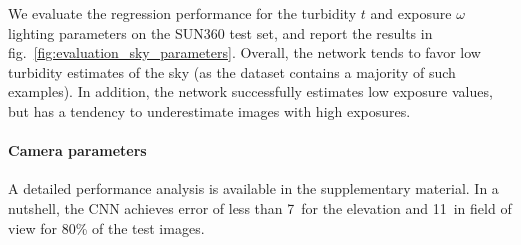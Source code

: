 
We evaluate the regression performance for the turbidity $t$ and exposure $\omega$ lighting parameters on the SUN360 test set, and report the results in fig.~\ref{fig:evaluation_sky_parameters}. Overall, the network tends to favor low turbidity estimates of the sky (as the dataset contains a majority of such examples). In addition, the network successfully estimates low exposure values, but has a tendency to underestimate images with high exposures.%
\vspace{-1.5em}
\paragraph{Camera parameters}

A detailed performance analysis is available in the supplementary material. In a nutshell, the CNN achieves error of less than 7\degree ~for the elevation and 11\degree ~in field of view for 80\% of the test images. 


